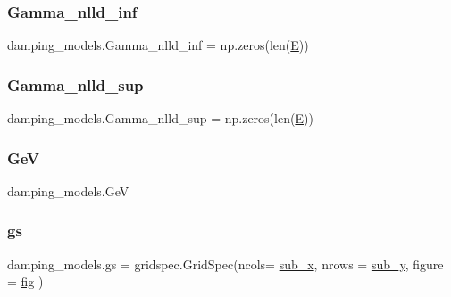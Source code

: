 \subsubsection{\texorpdfstring{Gamma\+\_\+nlld\+\_\+inf}{Gamma\_nlld\_inf}}
{\footnotesize\ttfamily damping\+\_\+models.\+Gamma\+\_\+nlld\+\_\+inf = np.\+zeros(len(\hyperlink{namespacedamping__models_a2d49832acd95610ad1ef20d532cda813}{E}))}

\mbox{\label{namespacedamping__models_a20e8113d2a6d5017dbed49f1e7c78592}} 
\subsubsection{\texorpdfstring{Gamma\+\_\+nlld\+\_\+sup}{Gamma\_nlld\_sup}}
{\footnotesize\ttfamily damping\+\_\+models.\+Gamma\+\_\+nlld\+\_\+sup = np.\+zeros(len(\hyperlink{namespacedamping__models_a2d49832acd95610ad1ef20d532cda813}{E}))}

\mbox{\label{namespacedamping__models_a3a9b1b9a4fb9d89f24a32482fbd62f61}} 
\subsubsection{\texorpdfstring{GeV}{GeV}}
{\footnotesize\ttfamily damping\+\_\+models.\+GeV}

\mbox{\label{namespacedamping__models_a7c226621eacbd06fba95e28c7a34d0bd}} 
\subsubsection{\texorpdfstring{gs}{gs}}
{\footnotesize\ttfamily damping\+\_\+models.\+gs = gridspec.\+Grid\+Spec(ncols= \hyperlink{namespacedamping__models_aae4b7950d55590d8c77efbf6a66533ab}{sub\+\_\+x}, nrows = \hyperlink{namespacedamping__models_a61a5ecedcc2899f63db8a15ab7af5699}{sub\+\_\+y}, figure = \hyperlink{namespacedamping__models_a9edc55435ab0261056120b91d9429732}{fig} )}

